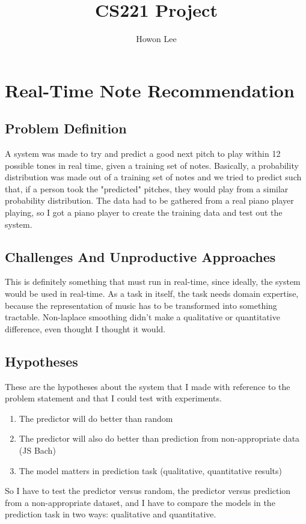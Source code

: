 \documentclass{article}
\begin{document}
\title{CS221 Project}
\author{Howon Lee}
\maketitle
\section*{Real-Time Note Recommendation}

\subsection*{Problem Definition}
A system was made to try and predict a good next pitch to play within 12 possible tones in real time, given a training set of notes. Basically, a probability distribution was made out of a training set of notes and we tried to predict such that, if a person took the "predicted" pitches, they would play from a similar probability distribution.
The data had to be gathered from a real piano player playing, so I got a piano player to create the training data and test out the system.
\subsection*{Challenges And Unproductive Approaches}
This is definitely something that must run in real-time, since ideally, the system would be used in real-time.
As a task in itself, the task needs domain expertise, because the representation of music has to be transformed into something tractable.
Non-laplace smoothing didn't make a qualitative or quantitative difference, even thought I thought it would.

\subsection*{Hypotheses}
These are the hypotheses about the system that I made with reference to the problem statement and that I could test with experiments.
\begin{enumerate}
    \item The predictor will do better than random
    \item The predictor will also do better than prediction from non-appropriate data (JS Bach)
    \item The model matters in prediction task (qualitative, quantitative results)
\end{enumerate}
So I have to test the predictor versus random, the predictor versus prediction from a non-appropriate dataset, and I have to compare the models in the prediction task in two ways: qualitative and quantitative.
\end{document}
